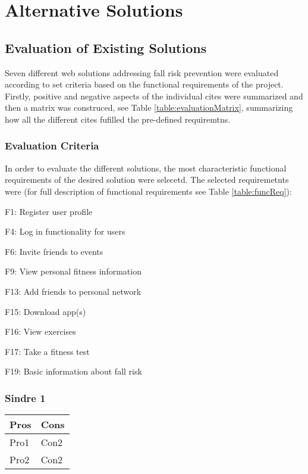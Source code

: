 
\chapter{Alternative Solutions}
\section{Evaluation of Existing Solutions}
Seven different web solutions addressing fall risk prevention were evaluated according to set criteria based on the functional requirements of the project. Firstly, positive and negative aspects of the individual cites were summarized and then a matrix was construced, see Table \ref{table:evaluationMatrix}, summarizing how all the different cites fufilled the pre-defined requiremtns.
\subsection{Evaluation Criteria}
In order to evaluate the different solutions, the most characteristic functional requirements of the desired solution were selecetd. The selected requiremetnts were (for full description of functional requirements see Table \ref{table:funcReq}):

F1: Register user profile

F4: Log in functionality for users 

F6: Invite friends to events 

F9: View personal fitness information

F13: Add friends to personal network

F15: Download app(s)

F16: View exercises

F17: Take a fitness test

F19: Basic information about fall risk


\subsection{Sindre 1}
\begin{center}
\begin{tabu} to 0.8\textwidth{ |X[l]|X[l]| } 
\hline {}
Pros & Cons \\
\hline
Pro1 & 
Con2 \\ 
\hline
Pro2 & Con2 \\ 
\hline

\end{tabu}
\end{center}

